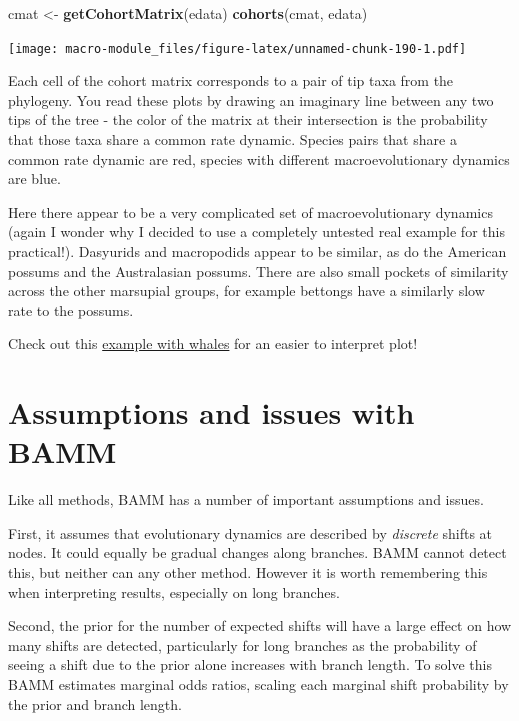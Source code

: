 \documentclass[]{book}
\newenvironment{Shaded}{\begin{snugshade}}{\end{snugshade}}
\newcommand{\KeywordTok}[1]{\textcolor[rgb]{0.13,0.29,0.53}{\textbf{{#1}}}}
\newcommand{\StringTok}[1]{\textcolor[rgb]{0.31,0.60,0.02}{{#1}}}
\newcommand{\NormalTok}[1]{{#1}}
\begin{document}
\begin{Shaded}
\begin{Highlighting}[]
\NormalTok{cmat <-}\StringTok{ }\KeywordTok{getCohortMatrix}\NormalTok{(edata)}
\KeywordTok{cohorts}\NormalTok{(cmat, edata)}
\end{Highlighting}
\end{Shaded}

\texttt{[image: macro-module\_files/figure-latex/unnamed-chunk-190-1.pdf]}

Each cell of the cohort matrix corresponds to a pair of tip taxa from
the phylogeny. You read these plots by drawing an imaginary line between
any two tips of the tree - the color of the matrix at their intersection
is the probability that those taxa share a common rate dynamic. Species
pairs that share a common rate dynamic are red, species with different
macroevolutionary dynamics are blue.

Here there appear to be a very complicated set of macroevolutionary
dynamics (again I wonder why I decided to use a completely untested real
example for this practical!). Dasyurids and macropodids appear to be
similar, as do the American possums and the Australasian possums. There
are also small pockets of similarity across the other marsupial groups,
for example bettongs have a similarly slow rate to the possums.

Check out this
\href{http://bamm-project.org/bammgraph.html\#whales-cohort}{example
with whales} for an easier to interpret plot!

\section{Assumptions and issues with
BAMM}\label{assumptions-and-issues-with-bamm}

Like all methods, BAMM has a number of important assumptions and issues.

First, it assumes that evolutionary dynamics are described by
\emph{discrete} shifts at nodes. It could equally be gradual changes
along branches. BAMM cannot detect this, but neither can any other
method. However it is worth remembering this when interpreting results,
especially on long branches.

Second, the prior for the number of expected shifts will have a large
effect on how many shifts are detected, particularly for long branches
as the probability of seeing a shift due to the prior alone increases
with branch length. To solve this BAMM estimates marginal odds ratios,
scaling each marginal shift probability by the prior and branch length.
\end{document}
